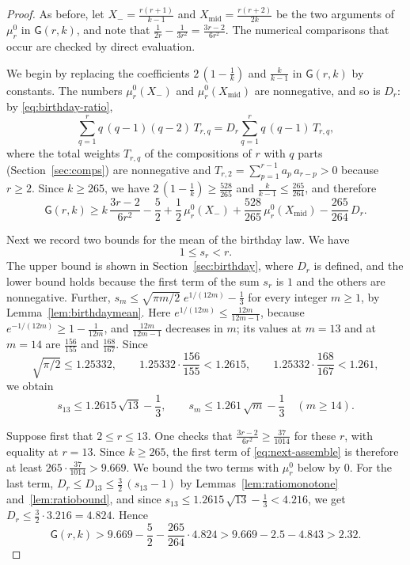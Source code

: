 \documentclass{amsart}
\theoremstyle{definition}
\theoremstyle{remark}
\numberwithin{equation}{section}
\begin{document}
\begin{proof}
As before, let $X_-=\frac{r(r+1)}{k-1}$ and $X_{\mathrm{mid}}=\frac{r(r+2)}{2k}$ be the two arguments of $\mu^0_r$ in $\mathsf G(r,k)$, and note that $\frac{1}{2r}-\frac{1}{3r^2}=\frac{3r-2}{6r^2}$. The numerical comparisons that occur are checked by direct evaluation.

We begin by replacing the coefficients $2\,(1-\frac1k)$ and $\frac{k}{k-1}$ in $\mathsf G(r,k)$ by constants. The numbers $\mu^0_r(X_-)$ and $\mu^0_r(X_{\mathrm{mid}})$ are nonnegative, and so is $D_r$: by \eqref{eq:birthday-ratio},
\[
\sum_{q=1}^{r}q\,(q-1)(q-2)\,T_{r,q}=D_r\sum_{q=1}^{r}q\,(q-1)\,T_{r,q},
\]
where the total weights $T_{r,q}$ of the compositions of $r$ with $q$ parts (Section~\ref{sec:comps}) are nonnegative and $T_{r,2}=\sum_{p=1}^{r-1}a_p\,a_{r-p}>0$ because $r\ge 2$. Since $k\ge 265$, we have $2\,(1-\frac1k)\ge\frac{528}{265}$ and $\frac{k}{k-1}\le\frac{265}{264}$, and therefore
\begin{equation}\label{eq:next-assemble}
\mathsf G(r,k)\ge k\,\frac{3r-2}{6r^2}-\frac52+\frac12\,\mu^0_r(X_-)+\frac{528}{265}\,\mu^0_r(X_{\mathrm{mid}})-\frac{265}{264}\,D_r .
\end{equation}

Next we record two bounds for the mean of the birthday law. We have
\[
1\le s_r<r .
\]
The upper bound is shown in Section~\ref{sec:birthday}, where $D_r$ is defined, and the lower bound holds because the first term of the sum $s_r$ is $1$ and the others are nonnegative. Further, $s_m\le\sqrt{\pi m/2}\;e^{1/(12m)}-\frac13$ for every integer $m\ge 1$, by Lemma~\ref{lem:birthdaymean}. Here $e^{1/(12m)}\le\frac{12m}{12m-1}$, because $e^{-1/(12m)}\ge 1-\frac{1}{12m}$, and $\frac{12m}{12m-1}$ decreases in $m$; its values at $m=13$ and at $m=14$ are $\frac{156}{155}$ and $\frac{168}{167}$. Since
\[
\sqrt{\pi/2}\le 1.25332,\qquad 1.25332\cdot\frac{156}{155}<1.2615,\qquad 1.25332\cdot\frac{168}{167}<1.261,
\]
we obtain
\[
s_{13}\le 1.2615\,\sqrt{13}-\frac13,\qquad s_m\le 1.261\,\sqrt m-\frac13\quad(m\ge 14).
\]

Suppose first that $2\le r\le 13$. One checks that $\frac{3r-2}{6r^2}\ge\frac{37}{1014}$ for these $r$, with equality at $r=13$. Since $k\ge 265$, the first term of \eqref{eq:next-assemble} is therefore at least $265\cdot\frac{37}{1014}>9.669$. We bound the two terms with $\mu^0_r$ below by $0$. For the last term, $D_r\le D_{13}\le\frac32\,(s_{13}-1)$ by Lemmas~\ref{lem:ratiomonotone} and~\ref{lem:ratiobound}, and since $s_{13}\le 1.2615\,\sqrt{13}-\frac13<4.216$, we get $D_r\le\frac32\cdot 3.216=4.824$. Hence
\[
\mathsf G(r,k)>9.669-\frac52-\frac{265}{264}\cdot 4.824>9.669-2.5-4.843>2.32 .
\]


\end{proof}
\end{document}
